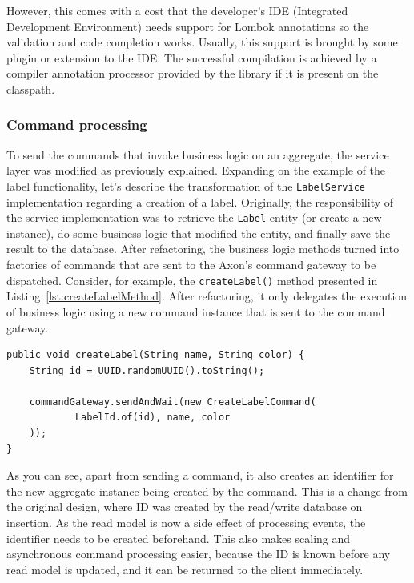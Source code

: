 \documentclass{book}
\begin{document}
However, this comes with a cost that the developer's IDE (Integrated
Development Environment) needs support for Lombok annotations so the
validation and code completion works. Usually, this support is brought
by some plugin or extension to the IDE. The successful compilation is
achieved by a compiler annotation processor provided by the library if
it is present on the classpath.


\subsubsection{Command processing}\label{command-processing}

To send the commands that invoke business logic on an aggregate, the
service layer was modified as previously explained. Expanding on the
example of the label functionality, let's describe the transformation of
the \texttt{LabelService} implementation regarding a creation of a
label. Originally, the responsibility of the service implementation was
to retrieve the \texttt{Label} entity (or create a new instance), do
some business logic that modified the entity, and finally save the
result to the database. After refactoring, the business logic methods
turned into factories of commands that are sent to the Axon's command
gateway to be dispatched. Consider, for example, the
\texttt{createLabel()} method presented in Listing~\ref{lst:createLabelMethod}.
After refactoring, it only delegates the execution of business
logic using a new command instance that is sent to the command gateway.

\begin{lstlisting}[caption={The \texttt{createLabel()} service method after refactoring},label={lst:createLabelMethod},captionpos=b,float,floatplacement=H]
public void createLabel(String name, String color) {
    String id = UUID.randomUUID().toString();

    commandGateway.sendAndWait(new CreateLabelCommand(
            LabelId.of(id), name, color
    ));
}
\end{lstlisting}

As you can see, apart from sending a command, it also creates an
identifier for the new aggregate instance being created by the command.
This is a change from the original design, where ID was created by the
read/write database on insertion. As the read model is now a side effect
of processing events, the identifier needs to be created beforehand.
This also makes scaling and asynchronous command processing easier,
because the ID is known before any read model is updated, and it can be
returned to the client immediately.
\end{document}
